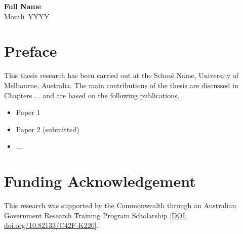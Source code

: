 \documentclass[12pt, a4paper, twoside]{book}
\newcommand{\thesisauthor}{Full Name}
\newcommand{\submissionmonth}{Month}
\newcommand{\submissionyear}{YYYY}
\newcommand{\school}{School Name}
\begin{document}
\noindent \textbf{\thesisauthor}\\
\submissionmonth\ \submissionyear
\newpage

%
\chapter*{Preface}

This thesis research has been carried out at the \school, University of Melbourne, Australia. 
The main contributions of the thesis are discussed in Chapters ... and are based on the following publications.

\begin{itemize}
    \item Paper 1 %
    \item Paper 2 (submitted)
    \item ...
\end{itemize}

\newpage

%
\chapter*{Funding Acknowledgement}
This research was supported by the Commonwealth through an Australian Government Research Training Program Scholarship [\href{https://doi.org/10.82133/C42F-K220}{DOI: doi.org/10.82133/C42F-K220}].


%
\end{document}
